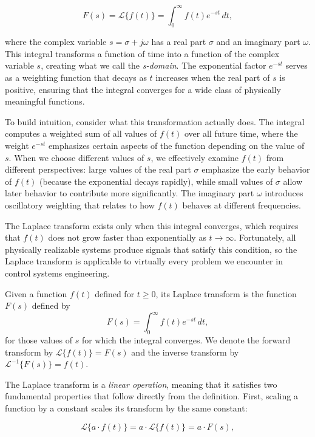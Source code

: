\[
F(s) = \mathcal{L}\{f(t)\} = \int_0^\infty f(t) e^{-st} \, dt,
\]

where the complex variable $s = \sigma + j\omega$ has a real part $\sigma$ and an imaginary part $\omega$. This integral transforms a function of time into a function of the complex variable $s$, creating what we call the \textit{s-domain}. The exponential factor $e^{-st}$ serves as a weighting function that decays as $t$ increases when the real part of $s$ is positive, ensuring that the integral converges for a wide class of physically meaningful functions.

To build intuition, consider what this transformation actually does. The integral computes a weighted sum of all values of $f(t)$ over all future time, where the weight $e^{-st}$ emphasizes certain aspects of the function depending on the value of $s$. When we choose different values of $s$, we effectively examine $f(t)$ from different perspectives: large values of the real part $\sigma$ emphasize the early behavior of $f(t)$ (because the exponential decays rapidly), while small values of $\sigma$ allow later behavior to contribute more significantly. The imaginary part $\omega$ introduces oscillatory weighting that relates to how $f(t)$ behaves at different frequencies.

The Laplace transform exists only when this integral converges, which requires that $f(t)$ does not grow faster than exponentially as $t \to \infty$. Fortunately, all physically realizable systems produce signals that satisfy this condition, so the Laplace transform is applicable to virtually every problem we encounter in control systems engineering.

\begin{definition}
Given a function $f(t)$ defined for $t \geq 0$, its Laplace transform is the function $F(s)$ defined by
\[
F(s) = \int_0^\infty f(t) e^{-st} \, dt,
\]
for those values of $s$ for which the integral converges. We denote the forward transform by $\mathcal{L}\{f(t)\} = F(s)$ and the inverse transform by $\mathcal{L}^{-1}\{F(s)\} = f(t)$.
\end{definition}

The Laplace transform is a \textit{linear operation}, meaning that it satisfies two fundamental properties that follow directly from the definition. First, scaling a function by a constant scales its transform by the same constant:

\[
\mathcal{L}\{a \cdot f(t)\} = a \cdot \mathcal{L}\{f(t)\} = a \cdot F(s),
\]

